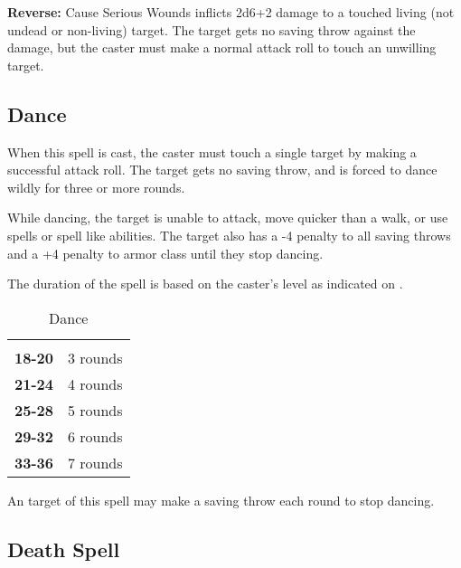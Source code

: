 \begin{multicols*}{2}
\textbf{Reverse:} \hypertarget{spell:Cause Serious Wounds}{Cause Serious Wounds} inflicts 2d6+2 damage to a touched living (not undead or non-living) target. The target gets no saving throw against the damage, but the caster must make a normal attack roll to touch an unwilling target.

\subsection{Dance}\label{spell:Dance}

When this spell is cast, the caster must touch a single target by making a successful attack roll. The target gets no saving throw, and is forced to dance wildly for three or more rounds.

While dancing, the target is unable to attack, move quicker than a walk, or use spells or spell like abilities. The target also has a -4 penalty to all saving throws and a +4 penalty to armor class until they stop dancing.

The duration of the spell is based on the caster’s level as indicated on .

\begin {table}[H]
	\caption{Dance}\label{tab:Dance}
  \begin{tabularx}{\columnwidth}{>{\bfseries}YY}
	 & \\
	18-20 & 3 rounds\\
	21-24 & 4 rounds\\
	25-28 & 5 rounds\\
	29-32 & 6 rounds\\
	33-36 & 7 rounds
  \end {tabularx}
\end {table}

An  target of this spell may make a saving throw each round to stop dancing.

\subsection{Death Spell}\label{spell:Death Spell}
\end{multicols*}
